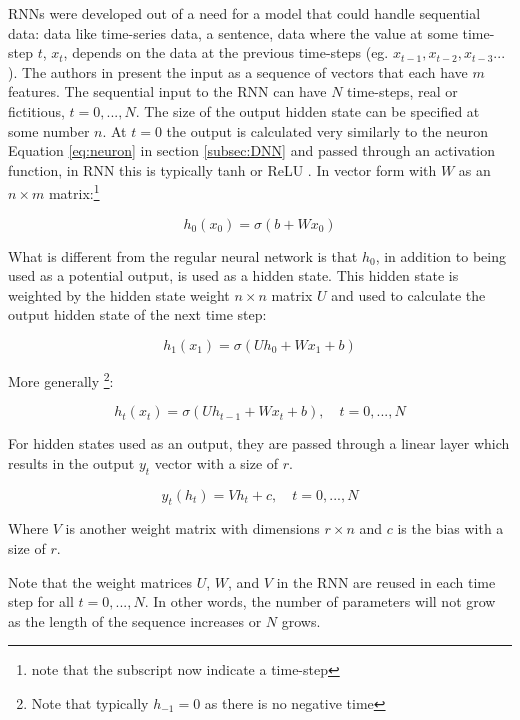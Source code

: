 RNNs were developed out of a need for a model that could handle sequential data: data like time-series data, a sentence, data where the value at some time-step $t$, $x_t$, depends on the data at the previous time-steps (eg. $x_{t-1}, x_{t-2}, x_{t-3}...$). The authors in \cite{salemRecurrentNeuralNetworks2022} present the input as a sequence of vectors that each have $m$ features. The sequential input to the RNN can have $N$ time-steps, real or fictitious, $t=0,...,N$. The size of the output hidden state can be specified at some number $n$. At $t=0$ the output is calculated very similarly to the neuron Equation \ref{eq:neuron} in section \ref{subsec:DNN} and passed through an activation function, in RNN this is typically tanh or ReLU \cite{salemRecurrentNeuralNetworks2022}. In vector form with $W$ as an $n \times m$ matrix:\footnote{note that the subscript now indicate a time-step}

\begin{equation}
    h_0(x_0) = \sigma(b + Wx_0)
\end{equation}

What is different from the regular neural network is that $h_0$, in addition to being used as a potential output,  is used as a hidden state. This hidden state is weighted by the hidden state weight $n \times n$ matrix $U$ and used to calculate the output hidden state of the next time step:

\begin{equation}
    h_1(x_1) = \sigma(Uh_0+Wx_1+b)
\end{equation}

More generally \cite{salemRecurrentNeuralNetworks2022}\footnote{Note that typically $h_{-1}=0$ as there is no negative time}:

\begin{equation}
    \label{eq:rnn-recursive}
    h_t(x_t) = \sigma(Uh_{t-1} + Wx_t+b), \quad t=0,...,N
\end{equation}

For hidden states used as an output, they are passed through a linear layer which results in the output $y_t$ vector with a size of $r$.

\begin{equation}
    \label{eq:rnn-output}
    y_t(h_t) = Vh_t + c, \quad t = 0,...,N
\end{equation}

Where $V$ is another weight matrix with dimensions $r \times n$ and $c$ is the bias with a size of $r$.

Note that the weight matrices $U$, $W$, and $V$ in the RNN are reused in each time step for all $t=0,...,N$. In other words, the number of parameters will not grow as the length of the sequence increases or $N$ grows.

